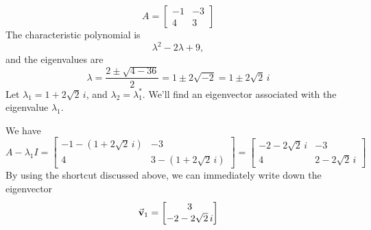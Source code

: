 \begin{xexample}
\[
   A = \begin{bmatrix} -1 & -3 \\ 4 & 3 \end{bmatrix}
\]
The characteristic polynomial is
\[
  \lambda^2 - 2\lambda + 9,
\]
and the eigenvalues are
\[
  \lambda = \frac{2\pm \sqrt{4-36}}{2} = 1\pm 2\sqrt{-2}
    = 1 \pm 2 \sqrt{2} \, i
\]
Let $\lambda_1 = 1 + 2\sqrt{2}\, i$, and $\lambda_2 = \lambda_1^{*}$.
We'll find an eigenvector associated with
the eigenvalue $\lambda_1$.

We have
\[
   A - \lambda_1 I = \begin{bmatrix}
                        -1-(1+2\sqrt{2}\,i) & -3 \\
			4 & 3-(1+2\sqrt{2}\,i)
                     \end{bmatrix}
		   = \begin{bmatrix}
		        -2-2\sqrt{2}\, i & -3 \\
			4 & 2-2\sqrt{2}\,i
		     \end{bmatrix}
\]
By using the shortcut discussed above, we can
immediately write down the eigenvector
\[
  \vec{\textbf{v}}_1 = \begin{bmatrix} 3 \\ -2-2\sqrt{2}\, i \end{bmatrix}
\]
\end{xexample}
